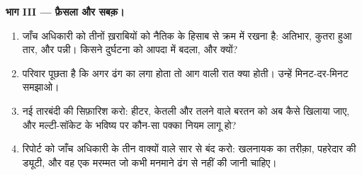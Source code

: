 \begin{problem}
\medskip\noindent\textbf{भाग III --- फ़ैसला और सबक़।}
\begin{enumerate}[resume]
  \item जाँच अधिकारी को तीनों ख़राबियों को नैतिक  के हिसाब से
        क्रम में रखना है: अतिभार, कुतरा हुआ तार, और पन्नी। किसने
        दुर्घटना को आपदा में बदला, और क्यों?
  \item परिवार पूछता है कि अगर ढंग का  लगा होता तो आग वाली रात
        क्या होती। उन्हें मिनट-दर-मिनट समझाओ।
  \item नई तारबंदी की सिफ़ारिश करो: हीटर, केतली और तलने वाले बरतन को
        अब कैसे खिलाया जाए, और मल्टी-सॉकेट के भविष्य पर कौन-सा पक्का
        नियम लागू हो?
  \item रिपोर्ट को जाँच अधिकारी के तीन वाक्यों वाले सार से बंद करो:
        खलनायक का तरीक़ा, पहरेदार की ड्यूटी, और वह एक मरम्मत जो कभी
        मनमाने ढंग से नहीं की जानी चाहिए।
\end{enumerate}
\end{problem}
